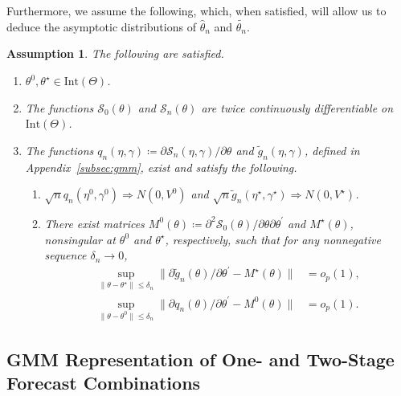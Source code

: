 \documentclass[12pt]{article}
\newtheorem{assumption}{Assumption}
\theoremstyle{definition}
\theoremstyle{remark}
\renewcommand{\appendixname}{Appendix}
\begin{document}
Furthermore, we assume the following, which, when satisfied, will allow us to deduce the asymptotic distributions of $\hat\theta_{n}$ and $\tilde{\theta_{n}}$.

\begin{assumption}
\label{ast:dist}
The following are satisfied.

\begin{enumerate}
\item $\theta^0, \theta^{\star} \in \mathrm{Int}(\Theta)$.
\item The functions $\mathcal{S}_0(\theta)$ and $\mathcal{S}_{n}(\theta)$ are twice continuously differentiable on $\text{Int}(\Theta)$.
\item The functions $q_{n}(\eta,\gamma) \coloneqq \partial \mathcal{S}_{n}(\eta,\gamma)/\partial\theta$ and $\tilde{g}_{n}(\eta,\gamma)$, defined in \appendixname\ \ref{subsec:gmm}, exist and satisfy the following.
\begin{enumerate}
\item $\sqrt{n} q_{n}(\eta^0, \gamma^0) \Rightarrow N(0, V^0)$ and $\sqrt{n} \tilde{g}_{n}(\eta^\star, \gamma^\star) \Rightarrow N(0, V^\star)$.

\item There exist matrices $M^0(\theta) \coloneqq \partial^2 \mathcal{S}_0(\theta)/\partial \theta \partial \theta^{\prime}$ and $M^\star(\theta)$, nonsingular at $\theta^0$ and $\theta^\star$, respectively, such that for any nonnegative sequence $\delta_n \to 0$, 
\begin{align*}
\sup_{\| \theta - \theta^\star \| \leq \delta_n} \| \partial \tilde{g}_{n}(\theta)/\partial\theta^{\prime} - M^\star(\theta) \| &= o_p(1), \\
\sup_{\| \theta - \theta^0 \| \leq \delta_n} \| \partial {q}_{n}(\theta) / \partial \theta^{\prime}-M^0(\theta)\| &= o_p(1).
\end{align*}
\end{enumerate}
\end{enumerate}
\end{assumption}

\subsection{GMM Representation of One- and Two-Stage Forecast Combinations\label{subsec:gmm}}
\end{document}
